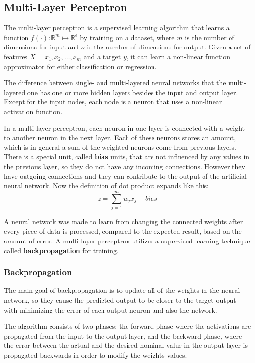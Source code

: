 \subsection{Multi-Layer Perceptron}

The multi-layer perceptron is a supervised learning algorithm that learns a function $f(\cdot) : \mathbb{R}^m \mapsto \mathbb{R}^o$ by training on a dataset, where $m$ is the number of dimensions for input and $o$ is the number of dimensions for output. Given a set of features $X = x_1, x_2, \dots, x_m$ and a target $y$, it can learn a non-linear function approximator for either classification or regression. \medskip

The difference between single- and multi-layered neural networks that the multi-layered one has one or more hidden layers besides the input and output layer. Except for the input nodes, each node is a neuron that uses a non-linear activation function. \medskip

In a multi-layer perceptron, each neuron in one layer is connected with a weight to another neuron in the next layer. Each of these neurons stores an amount, which is in general a sum of the weighted neurons come from previous layers. There is a special unit, called \textbf{bias} units, that are not influenced by any values in the previous layer, so they do not have any incoming connections. However they have outgoing connections and they can contribute to the output of the artificial neural network. Now the definition of dot product expands like this:
$$ z = \sum_{j=1}^m w_j x_j + bias $$

A neural network was made to learn from changing the connected weights after every piece of data is processed, compared to the expected result, based on the amount of error. A multi-layer perceptron utilizes a supervised learning technique called \textbf{backpropagation} for training.


\subsubsection{Backpropagation}

The main goal of backpropagation is to update all of the weights in the neural network, so they cause the predicted output to be closer to the target output with minimizing the error of each output neuron and also the network. \medskip

The algorithm consists of two phases: the forward phase where the activations are propagated from the input to the output layer, and the backward phase, where the error between the actual and the desired nominal value in the output layer is propagated backwards in order to modify the weights values. \medskip

